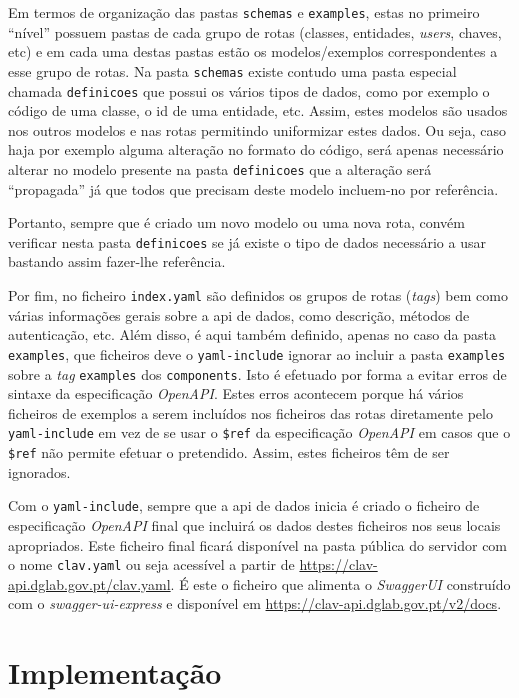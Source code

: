 Em termos de organização das pastas \texttt{schemas} e \texttt{examples}, estas no primeiro ``nível'' possuem 
pastas de cada grupo de rotas (classes, entidades, \textit{users}, chaves, etc) e em cada uma destas pastas estão 
os modelos/exemplos correspondentes a esse grupo de rotas. Na pasta \texttt{schemas} existe contudo uma pasta 
especial chamada \texttt{definicoes} que possui os vários tipos de dados, como por exemplo o código de uma classe, 
o id de uma entidade, etc. Assim, estes modelos são usados nos outros modelos e nas rotas permitindo uniformizar 
estes dados. Ou seja, caso haja por exemplo alguma alteração no formato do código, será apenas necessário alterar 
no modelo presente na pasta \texttt{definicoes} que a alteração será ``propagada'' já que todos que precisam deste 
modelo incluem-no por referência. 

Portanto, sempre que é criado um novo modelo ou uma nova rota, convém verificar nesta pasta \texttt{definicoes} 
se já existe o tipo de dados necessário a usar bastando assim fazer-lhe referência.

Por fim, no ficheiro \texttt{index.yaml} são definidos os grupos de rotas (\textit{tags}) bem como várias 
informações gerais sobre a \acrshort{api} de dados, como descrição, métodos de autenticação, etc. 
Além disso, é aqui também definido, apenas no caso da pasta \texttt{examples}, que ficheiros deve o 
\texttt{yaml-include} ignorar ao incluir a pasta \texttt{examples} sobre a \textit{tag} \texttt{examples} 
dos \texttt{components}. Isto é efetuado por forma a evitar erros de sintaxe da especificação \textit{OpenAPI}. 
Estes erros acontecem porque há vários ficheiros de exemplos a serem incluídos nos ficheiros das rotas diretamente 
pelo \texttt{yaml-include} em vez de se usar o \verb|$ref| da especificação \textit{OpenAPI} em casos que o 
\verb|$ref| não permite efetuar o pretendido. Assim, estes ficheiros têm de ser ignorados.

Com o \texttt{yaml-include}, sempre que a \acrshort{api} de dados inicia é criado o ficheiro de especificação 
\textit{OpenAPI} final que incluirá os dados destes ficheiros nos seus locais apropriados. 
Este ficheiro final ficará disponível na pasta pública do servidor com o nome \texttt{clav.yaml} 
ou seja acessível a partir de \url{https://clav-api.dglab.gov.pt/clav.yaml}. É este o ficheiro que alimenta o 
\textit{SwaggerUI} construído com o \textit{swagger-ui-express} e disponível em 
\url{https://clav-api.dglab.gov.pt/v2/docs}.

\section{Implementação}

